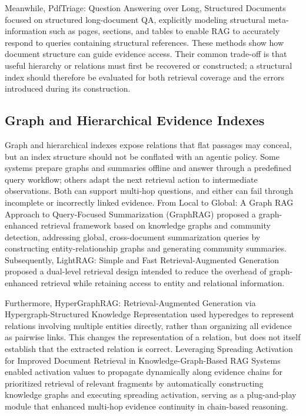 Meanwhile, PdfTriage: Question Answering over Long, Structured Documents \cite{saad2024pdftriage} focused on structured long-document QA, explicitly modeling structural meta-information such as pages, sections, and tables to enable RAG to accurately respond to queries containing structural references. These methods show how document structure can guide evidence access. Their common trade-off is that useful hierarchy or relations must first be recovered or constructed; a structural index should therefore be evaluated for both retrieval coverage and the errors introduced during its construction.

\subsection{Graph and Hierarchical Evidence Indexes}

Graph and hierarchical indexes expose relations that flat passages may conceal, but an index structure should not be conflated with an agentic policy. Some systems prepare graphs and summaries offline and answer through a predefined query workflow; others adapt the next retrieval action to intermediate observations. Both can support multi-hop questions, and either can fail through incomplete or incorrectly linked evidence. From Local to Global: A Graph RAG Approach to Query-Focused Summarization \cite{edge2024graphrag} (GraphRAG) proposed a graph-enhanced retrieval framework based on knowledge graphs and community detection, addressing global, cross-document summarization queries by constructing entity-relationship graphs and generating community summaries. Subsequently, LightRAG: Simple and Fast Retrieval-Augmented Generation \cite{guo2024lightrag} proposed a dual-level retrieval design intended to reduce the overhead of graph-enhanced retrieval while retaining access to entity and relational information.

Furthermore, HyperGraphRAG: Retrieval-Augmented Generation via Hypergraph-Structured Knowledge Representation \cite{he2024hypergraphrag} used hyperedges to represent relations involving multiple entities directly, rather than organizing all evidence as pairwise links. This changes the representation of a relation, but does not itself establish that the extracted relation is correct. Leveraging Spreading Activation for Improved Document Retrieval in Knowledge-Graph-Based RAG Systems \cite{pavlovic2025leveraging} enabled activation values to propagate dynamically along evidence chains for prioritized retrieval of relevant fragments by automatically constructing knowledge graphs and executing spreading activation, serving as a plug-and-play module that enhanced multi-hop evidence continuity in chain-based reasoning.


